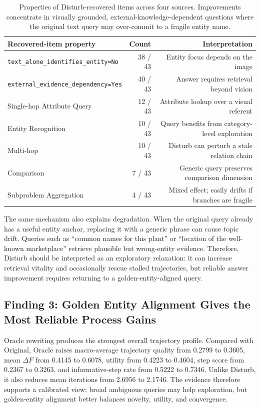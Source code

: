 \documentclass{article}
\newcommand{\df}{\Delta F}
\begin{document}
\begin{table}[t]
\centering
\small
\setlength{\tabcolsep}{6pt}
\begin{tabular}{lrr}
\hline
Recovered-item property & Count & Interpretation \\
\hline
\texttt{text\_alone\_identifies\_entity=No} & 38 / 43 & Entity focus depends on the image \\
\texttt{external\_evidence\_dependency=Yes} & 40 / 43 & Answer requires retrieval beyond vision \\
Single-hop Attribute Query & 12 / 43 & Attribute lookup over a visual referent \\
Entity Recognition & 10 / 43 & Query benefits from category-level exploration \\
Multi-hop & 10 / 43 & Disturb can perturb a stale relation chain \\
Comparison & 7 / 43 & Generic query preserves comparison dimension \\
Subproblem Aggregation & 4 / 43 & Mixed effect; easily drifts if branches are fragile \\
\hline
\end{tabular}
\caption{Properties of Disturb-recovered items across four sources. Improvements concentrate in visually grounded, external-knowledge-dependent questions where the original text query may over-commit to a fragile entity name.}
\label{tab:disturb-recovered-item-properties}
\end{table}

The same mechanism also explains degradation.
When the original query already has a useful entity anchor, replacing it with a generic phrase can cause topic drift.
Queries such as ``common names for this plant'' or ``location of the well-known marketplace'' retrieve plausible but wrong-entity evidence.
Therefore, Disturb should be interpreted as an exploratory relaxation: it can increase retrieval vitality and occasionally rescue stalled trajectories, but reliable answer improvement requires returning to a golden-entity-aligned query.

\subsection{Finding 3: Golden Entity Alignment Gives the Most Reliable Process Gains}
Oracle rewriting produces the strongest overall trajectory profile.
Compared with Original, Oracle raises macro-average trajectory quality from 0.2799 to 0.3605, mean $\df$ from 0.4145 to 0.6078, utility from 0.4223 to 0.4604, step score from 0.2367 to 0.3263, and informative-step rate from 0.5222 to 0.7346.
Unlike Disturb, it also reduces mean iterations from 2.6956 to 2.1746.
The evidence therefore supports a calibrated view: broad ambiguous queries may help exploration, but golden-entity alignment better balances novelty, utility, and convergence.
\end{document}
